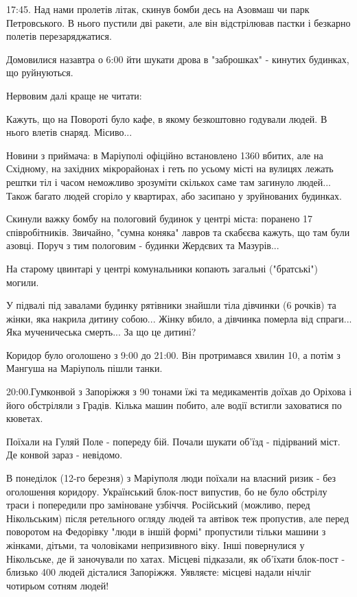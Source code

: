 17:45. Над нами пролетів літак, скинув бомби десь на Азовмаш чи парк
Петровського. В нього пустили дві ракети, але він відстрілював пастки і
безкарно полетів перезаряджатися.

Домовилися назавтра о 6:00 йти шукати дрова в "заброшках" - кинутих будинках,
що руйнуються. 

Нервовим далі краще не читати:

Кажуть, що на Повороті було кафе, в якому безкоштовно годували людей. В нього
влетів снаряд. Місиво...

Новини з приймача: в Маріуполі офіційно встановлено 1360 вбитих, але на
Східному, на західних мікрорайонах і геть по усьому місті на вулицях лежать
рештки тіл і часом неможливо зрозуміти скількох саме там загинуло людей...
Також багато людей сгоріло у квартирах, або засипано у зруйнованих будинках.

Скинули важку бомбу на пологовий будинок у центрі міста: поранено 17
співробітників. Звичайно, "сумна коняка" лавров та скабєєва кажуть, що там були
азовці.  Поруч з тим пологовим - будинки Жердєвих та Мазурів...

На старому цвинтарі у центрі комунальники копають загальні ("братські") могили.

У підвалі під завалами будинку рятівники знайшли тіла дівчинки (6 рочків) та
жінки, яка накрила дитину собою... Жінку вбило, а дівчинка померла від
спраги... Яка мученичеська смерть... За що це дитині?

Коридор було оголошено з 9:00 до 21:00. Він протримався хвилин 10, а потім з
Мангуша на Маріуполь пішли танки.  

20:00.Гумконвой з Запоріжжя з 90 тонами їжі та медикаментів  доїхав до Оріхова
і його обстріляли з Градів. Кілька машин побито, але водії встигли заховатися
по кюветах.

Поїхали на Гуляй Поле - попереду бій. Почали шукати об'їзд - підірваний міст.
Де конвой зараз - невідомо.

В понеділок (12-го березня) з Маріуполя люди поїхали на власний ризик - без
оголошення коридору. Український блок-пост випустив, бо не було обстрілу траси
і попередили про заміноване узбіччя. Російський (можливо, перед Нікольським)
після ретельного огляду людей та автівок теж пропустив, але перед поворотом на
Федорівку "люди в іншій формі" пропустили тільки машини з жінками, дітьми, та
чоловіками непризивного віку. Інші повернулися у Нікольське, де й заночували по
хатах. Місцеві підказали, як об'їхати блок-пост - близько 400 людей дісталися
Запоріжжя. Уявляєте: місцеві надали нічліг чотирьом сотням людей!  

